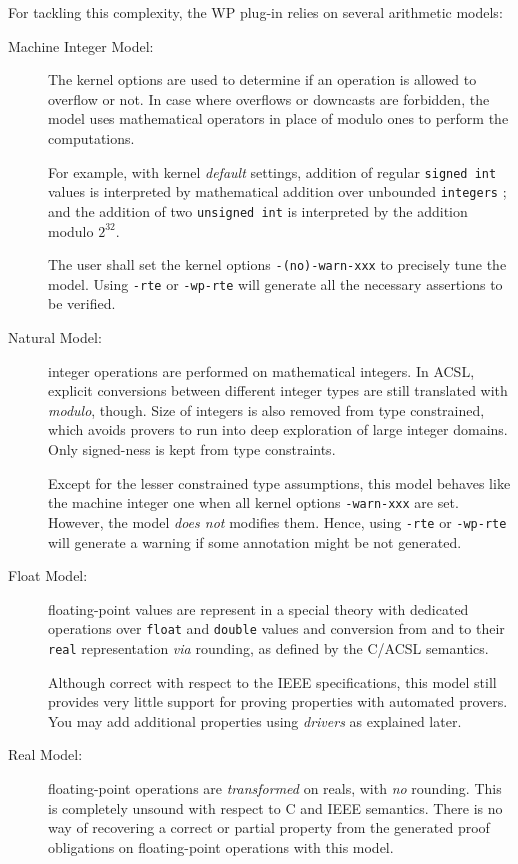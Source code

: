 For tackling this complexity, the \textsf{WP} plug-in relies on several
\textsf{arithmetic} models:

\begin{description}

\item[Machine Integer Model:] The kernel options are used to determine if an
  operation is allowed to overflow or not. In case where overflows or downcasts
  are forbidden, the model uses mathematical operators in place of modulo ones
  to perform the computations.

  For example, with kernel \emph{default} settings, addition of regular
  \texttt{signed int} values is interpreted by mathematical addition over
  unbounded \texttt{integers} ; and the addition of two
  \texttt{unsigned int} is interpreted by the addition modulo $2^{32}$.

  The user shall set the kernel options \texttt{-(no)-warn-xxx} to precisely tune the
  model. Using \texttt{-rte} or \texttt{-wp-rte} will
  generate all the necessary assertions to be verified.

\item[Natural Model:] integer operations are performed on mathematical
  integers. In \textsf{ACSL}, explicit conversions between different integer
  types are still translated with \emph{modulo}, though. Size of integers is
  also removed from type constrained, which avoids provers to run into deep
  exploration of large integer domains. Only signed-ness is kept from type
  constraints.

  Except for the lesser constrained type assumptions, this model behaves like
  the machine integer one when all kernel options \texttt{-warn-xxx} are set.
  However, the model \emph{does not} modifies them. Hence, using \texttt{-rte}
  or \texttt{-wp-rte} will generate a warning if some annotation might be not
  generated.

\item[Float Model:] floating-point values are represent in a special
  theory with dedicated operations over \texttt{float} and \texttt{double}
  values and conversion from and to their \texttt{real} representation \emph{via}
  rounding, as defined by the \textsf{C/ACSL} semantics.

  Although correct with respect to the \textsc{IEEE} specifications, this
  model still provides very little support for proving properties with automated
  provers. You may add additional properties using \emph{drivers}
  as explained later.

\item[Real Model:] floating-point operations are \emph{transformed} on
  reals, with \emph{no} rounding. This is completely unsound with
  respect to \textsf{C} and \textsf{IEEE} semantics. There is no way
  of recovering a correct or partial property from the generated proof
  obligations on floating-point operations with this model.

\end{description}

